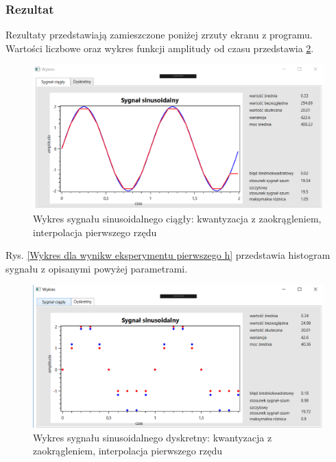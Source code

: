 \documentclass[12pt]{article}
\begin{document}
\subsubsection{Rezultat}

Rezultaty przedstawiają zamieszczone poniżej zrzuty ekranu z programu. Wartości liczbowe oraz wykres funkcji amplitudy od czasu przedstawia \ref{Histogram dla wyników eksperymentu drugiego}.
\begin{figure}[h!]
 \centering
 \includegraphics[width=12.3cm]{SinKwantZaokrIntA2T2f10H2t1C.PNG}
 \vspace{-0.3cm}
 \caption{Wykres sygnału sinusoidalnego ciągły: kwantyzacja z zaokrągleniem, interpolacja pierwszego rzędu}
 \label{Wykres dla wyników eksperymentu drugiego}
\end{figure}
\newpage
Rys. \ref{Wykres dla wynikw eksperymentu pierwszego h} przedstawia histogram sygnału z opisanymi powyżej parametrami. 
\begin{figure}[h!]
 \centering
 \includegraphics[width=12.3cm]{SinKwantZaokrIntA2T2f10H2t1D.PNG}
 \vspace{-0.3cm}
 \caption{Wykres sygnału sinusoidalnego dyskretny: kwantyzacja z zaokrągleniem, interpolacja pierwszego rzędu}
 \label{Histogram dla wyników eksperymentu drugiego}
\end{figure}

\end{document}
